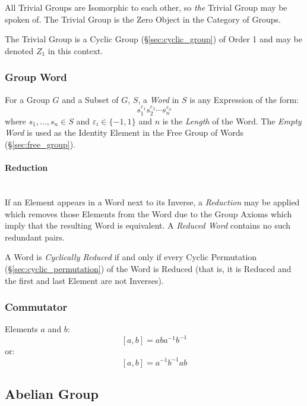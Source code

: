 All Trivial Groups are Isomorphic to each other, so \emph{the} Trivial
Group may be spoken of. The Trivial Group is the Zero Object in the
Category of Groups.

The Trivial Group is a Cyclic Group (\S\ref{sec:cyclic_group}) of
Order 1 and may be denoted $Z_1$ in this context.



\subsubsection{Group Word}\label{sec:group_word}

For a Group $G$ and a Subset of $G$, $S$, a \emph{Word} in $S$ is any
Expression of the form:
\[
    s_1^{\varepsilon_1}s_2^{\varepsilon_2} \cdots s_n^{\varepsilon_n}
\]
where $s_1,\ldots,s_n \in S$ and $\varepsilon_i \in \{-1, 1\}$ and $n$
is the \emph{Length} of the Word. The \emph{Empty Word} is used as the
Identity Element in the Free Group of Words (\S\ref{sec:free_group}).



\paragraph{Reduction}\label{sec:word_reduction}
\hfill \\

If an Element appears in a Word next to its Inverse, a
\emph{Reduction} may be applied which removes those Elements from the
Word due to the Group Axioms which imply that the resulting Word is
equivalent. A \emph{Reduced Word} contains no such redundant pairs.

A Word is \emph{Cyclically Reduced} if and only if every Cyclic
Permutation (\S\ref{sec:cyclic_permutation}) of the Word is Reduced
(that is, it is Reduced and the first and last Element are not
Inverses).



\subsubsection{Commutator}\label{sec:commutator}

Elements $a$ and $b$:
\[
  [a,b] = aba^{-1}b^{-1}
\]
or:
\[
  [a,b] = a^{-1}b^{-1}ab
\]



\subsection{Abelian Group}\label{sec:abelian_group}

